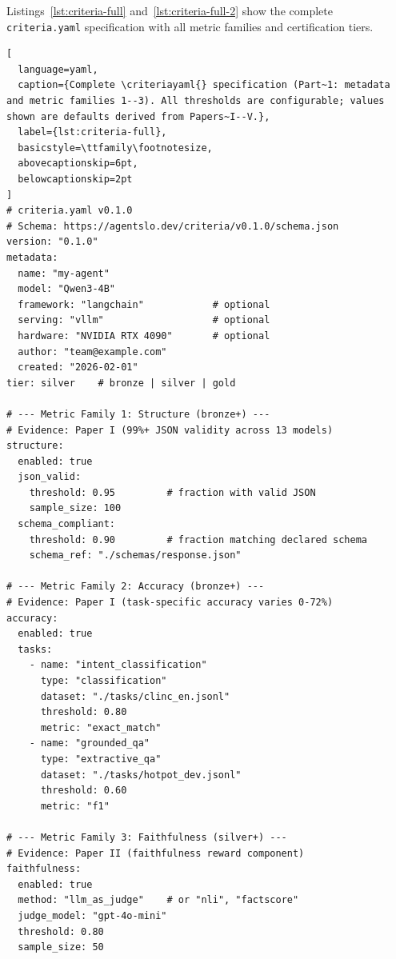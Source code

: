 \documentclass[11pt]{article}
\newcommand{\criteriayaml}{\texttt{criteria.yaml}}
\begin{document}
Listings~\ref{lst:criteria-full} and~\ref{lst:criteria-full-2} show the complete \criteriayaml{} specification with all metric families and certification tiers.

\begin{lstlisting}[
  language=yaml,
  caption={Complete \criteriayaml{} specification (Part~1: metadata and metric families 1--3). All thresholds are configurable; values shown are defaults derived from Papers~I--V.},
  label={lst:criteria-full},
  basicstyle=\ttfamily\footnotesize,
  abovecaptionskip=6pt,
  belowcaptionskip=2pt
]
# criteria.yaml v0.1.0
# Schema: https://agentslo.dev/criteria/v0.1.0/schema.json
version: "0.1.0"
metadata:
  name: "my-agent"
  model: "Qwen3-4B"
  framework: "langchain"            # optional
  serving: "vllm"                   # optional
  hardware: "NVIDIA RTX 4090"       # optional
  author: "team@example.com"
  created: "2026-02-01"
tier: silver    # bronze | silver | gold

# --- Metric Family 1: Structure (bronze+) ---
# Evidence: Paper I (99%+ JSON validity across 13 models)
structure:
  enabled: true
  json_valid:
    threshold: 0.95         # fraction with valid JSON
    sample_size: 100
  schema_compliant:
    threshold: 0.90         # fraction matching declared schema
    schema_ref: "./schemas/response.json"

# --- Metric Family 2: Accuracy (bronze+) ---
# Evidence: Paper I (task-specific accuracy varies 0-72%)
accuracy:
  enabled: true
  tasks:
    - name: "intent_classification"
      type: "classification"
      dataset: "./tasks/clinc_en.jsonl"
      threshold: 0.80
      metric: "exact_match"
    - name: "grounded_qa"
      type: "extractive_qa"
      dataset: "./tasks/hotpot_dev.jsonl"
      threshold: 0.60
      metric: "f1"

# --- Metric Family 3: Faithfulness (silver+) ---
# Evidence: Paper II (faithfulness reward component)
faithfulness:
  enabled: true
  method: "llm_as_judge"    # or "nli", "factscore"
  judge_model: "gpt-4o-mini"
  threshold: 0.80
  sample_size: 50
\end{lstlisting}
\end{document}
